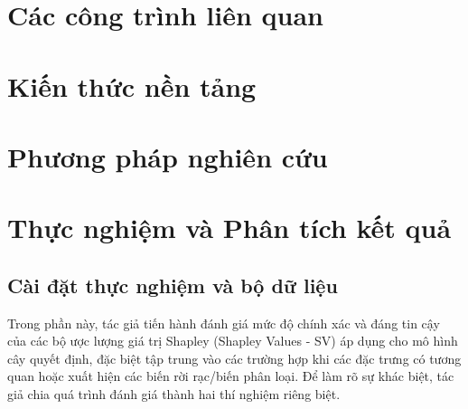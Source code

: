 \documentclass[12pt, a4paper]{article}
\begin{document}
\section{Các công trình liên quan}
\section{Kiến thức nền tảng}
\section{Phương pháp nghiên cứu}

\section{Thực nghiệm và Phân tích kết quả}
\subsection{Cài đặt thực nghiệm và bộ dữ liệu}

Trong phần này, tác giả tiến hành đánh giá mức độ chính xác và đáng tin cậy của các bộ ược lượng giá trị Shapley (Shapley Values - SV) áp dụng cho mô hình cây quyết định, đặc biệt tập trung vào các trường hợp khi các đặc trưng có tương quan hoặc xuất hiện các biến rời rạc/biến phân loại. Để làm rõ sự khác biệt, tác giả chia quá trình đánh giá thành hai thí nghiệm riêng biệt.
\end{document}

